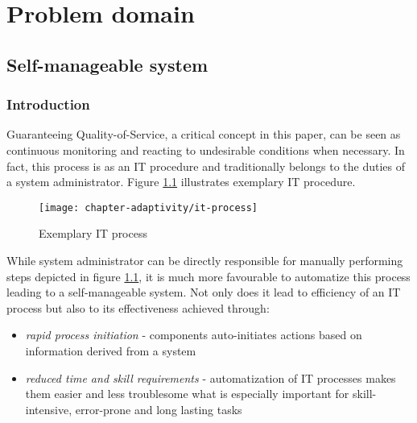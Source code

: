 \chapter{Problem domain}

\section{Self-manageable system}

\subsection{Introduction}
Guaranteeing Quality-of-Service, a critical concept in this paper, can be seen as continuous monitoring and reacting to undesirable conditions when necessary. In fact, this process is as an IT procedure and traditionally belongs to the duties of a system administrator. Figure \ref{fig:it-process} illustrates exemplary IT procedure.

\begin{figure}[!ht]
  \begin{center}
    \texttt{[image: chapter-adaptivity/it-process]}
  \end{center}
  \caption{Exemplary IT process}
  \label{fig:it-process}
\end{figure}

While system administrator can be directly responsible for manually performing steps depicted in figure \ref{fig:it-process}, it is much more favourable to automatize this process leading to a self-manageable system. Not only does it lead to efficiency of an IT process but also to its effectiveness \cite{IBM06} achieved through:
\begin{itemize}
  \item \emph{rapid process initiation} - components auto-initiates actions based on information derived from a system
  \item \emph{reduced time and skill requirements} - automatization of IT processes makes them easier and less troublesome what is especially important for skill-intensive, error-prone and long lasting tasks
\end{itemize}

